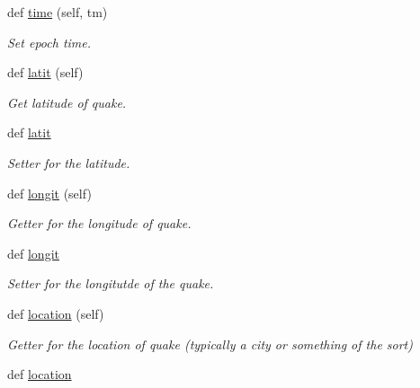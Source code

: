 \begin{DoxyCompactItemize}
def \mbox{\hyperlink{classbridges_1_1data__src__dependent_1_1earthquake__usgs_1_1_earthquake_u_s_g_s_ac0c0fdf4e37183ad46765019f16ee9ef}{time}} (self, tm)
\begin{DoxyCompactList}\small\item\em Set epoch time. \end{DoxyCompactList}\item 
def \mbox{\hyperlink{classbridges_1_1data__src__dependent_1_1earthquake__usgs_1_1_earthquake_u_s_g_s_ab582eb6b2e8836e10c35f60e14d128d0}{latit}} (self)
\begin{DoxyCompactList}\small\item\em Get latitude of quake. \end{DoxyCompactList}\item 
def \mbox{\hyperlink{classbridges_1_1data__src__dependent_1_1earthquake__usgs_1_1_earthquake_u_s_g_s_aff234b9c32bedb8dc8e339de82dc46ef}{latit}}
\begin{DoxyCompactList}\small\item\em Setter for the latitude. \end{DoxyCompactList}\item 
def \mbox{\hyperlink{classbridges_1_1data__src__dependent_1_1earthquake__usgs_1_1_earthquake_u_s_g_s_a98a8f3ee07d05b57c5028b2bad8be9bf}{longit}} (self)
\begin{DoxyCompactList}\small\item\em Getter for the longitude of quake. \end{DoxyCompactList}\item 
def \mbox{\hyperlink{classbridges_1_1data__src__dependent_1_1earthquake__usgs_1_1_earthquake_u_s_g_s_afbd9e47192dbf4b27f694297b83697c6}{longit}}
\begin{DoxyCompactList}\small\item\em Setter for the longitutde of the quake. \end{DoxyCompactList}\item 
def \mbox{\hyperlink{classbridges_1_1data__src__dependent_1_1earthquake__usgs_1_1_earthquake_u_s_g_s_a3b8f61c92ee3c13d3cd54bc264378882}{location}} (self)
\begin{DoxyCompactList}\small\item\em Getter for the location of quake (typically a city or something of the sort) \end{DoxyCompactList}\item 
def \mbox{\hyperlink{classbridges_1_1data__src__dependent_1_1earthquake__usgs_1_1_earthquake_u_s_g_s_a3004af322cb3d2179f17ce0210571c22}{location}}

\end{DoxyCompactItemize}
